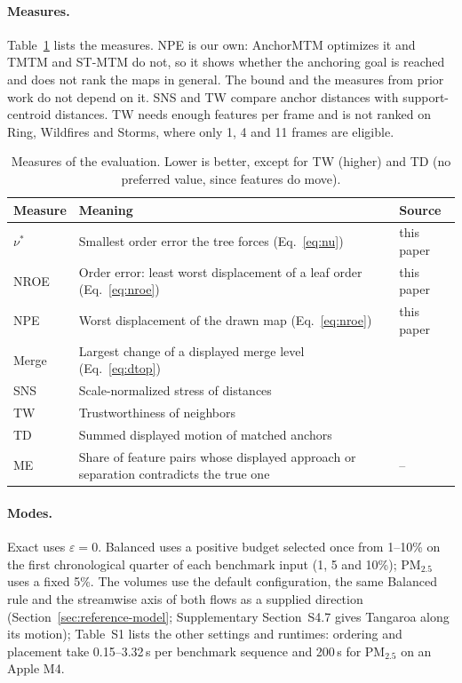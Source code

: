 \paragraph{Measures.} Table~\ref{tab:measures} lists the measures. NPE is our own: AnchorMTM optimizes it and TMTM and ST-MTM do not, so it shows whether the anchoring goal is reached and does not rank the maps in general. The bound and the measures from prior work do not depend on it. SNS and TW compare anchor distances with support-centroid distances. TW needs enough features per frame and is not ranked on Ring, Wildfires and Storms, where only 1, 4 and 11 frames are eligible.

\begin{table}[!tb]
\centering
\caption{Measures of the evaluation. Lower is better, except for TW (higher) and TD (no preferred value, since features do move).}
\label{tab:measures}
\footnotesize
\setlength{\tabcolsep}{3pt}
\renewcommand{\arraystretch}{0.95}
\begin{tabular}{@{}lp{}l@{}}
\toprule
Measure & Meaning & Source\\
\midrule
$\nu^*$ & Smallest order error the tree forces (Eq.~\ref{eq:nu}) & this paper\\
NROE & Order error: least worst displacement of a leaf order (Eq.~\ref{eq:nroe}) & this paper\\
NPE & Worst displacement of the drawn map (Eq.~\ref{eq:nroe}) & this paper\\
Merge & Largest change of a displayed merge level (Eq.~\ref{eq:dtop}) & \cite{Munch:2019:LINF}\\
SNS & Scale-normalized stress of distances & \cite{Smelser:2025:Scale}\\
TW & Trustworthiness of neighbors & \cite{Venna:2001:NP}\\
TD & Summed displayed motion of matched anchors & \cite{STMTM:2026}\\
ME & Share of feature pairs whose displayed approach or separation contradicts the true one & --\\
\bottomrule
\end{tabular}
\end{table}

\paragraph{Modes.} Exact uses $\varepsilon=0$. Balanced uses a positive budget selected once from 1--10\% on the first chronological quarter of each benchmark input (1, 5 and 10\%); PM$_{2.5}$ uses a fixed 5\%. The volumes use the default configuration, the same Balanced rule and the streamwise axis of both flows as a supplied direction (Section~\ref{sec:reference-model}; Supplementary Section~S4.7 gives Tangaroa along its motion); Table~S1 lists the other settings and runtimes: ordering and placement take 0.15--3.32\,s per benchmark sequence and 200\,s for PM$_{2.5}$ on an Apple M4.

